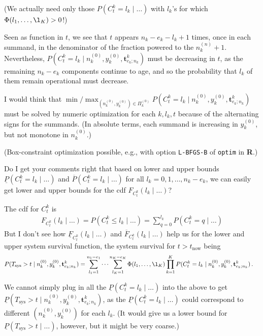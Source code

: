 \documentclass[12pt,a4paper,fleqn]{narms}
\newcommand{\mbf}[1]{\mathbf{#1}}
\newcommand{\uz}{^{(0)}} %
\newcommand{\un}{^{(n)}} %
\newcommand{\ul}[1]{\underline{#1}}
\newcommand{\ol}[1]{\overline{#1}}
\def\Tsys{T_\text{sys}}
\def\ykz{y\uz_k}
\def\nkz{n\uz_k}
\def\nkn{n\un_k}
\def\PkZ{\Pi\uz_k}
\def\tnow{t_\text{now}}
\begin{document}
(We actually need only those $P(C^k_t = l_k\mid \ldots)$ with $l_k$'s
for which $\Phi(l_1,\ldots,\l_K) > 0$!)


Seen as function in $t$, we see that $t$ appears $n_k-e_k-l_k+1$ times,
once in each summand, in the denominator of the fraction powered to the $\nkn+1$.
Nevertheless, $P(C^k_t = l_k\mid\nkz,\ykz, \mbf{t}^k_{e_k;n_k})$
must be decreasing in $t$, as the remaining $n_k-e_k$ components continue to age,
and so the probability that $l_k$ of them remain operational must decrease.

I would think that
$\min / \max_{(\nkz,\ykz) \in \PkZ} P(C^k_t = l_k\mid\nkz,\ykz, \mbf{t}^k_{e_k;n_k})$
must be solved by numeric optimization for each $k, l_k, t$ 
because of the alternating signs for the summands.
(In absolute terms, each summand is increasing in $\ykz$, but not monotone in $\nkz$.)

(Box-constraint optimization possible, e.g., with option \texttt{L-BFGS-B} of \texttt{optim} in \textbf{R}.)

Do I get your comments right that based on lower and upper bounds
$\ul{P}(C^k_t = l_k\mid \ldots)$ and $\ol{P}(C^k_t = l_k\mid \ldots)$ for all $l_k = 0, 1, \ldots, n_k - e_k$,
we can easily get lower and upper bounds for the cdf $F_{C^k_t}(l_k \mid \ldots)$?

The cdf for $C^k_t$ is 
\begin{align}
F_{C^k_t}(l_k \mid \ldots) = P(C^k_t \leq l_k\mid\ldots) = \sum_{q=0}^{l_k} P(C^k_t = q\mid\ldots)
\end{align} 
But I don't see how $\ul{F}_{C^k_t}(l_k \mid \ldots)$ and $\ol{F}_{C^k_t}(l_k \mid \ldots)$
help us for the lower and upper system survival function,
the system survival for $t > \tnow$ being
\begin{align}
P(\Tsys > t\mid\nkz,\ykz, \mbf{t}^k_{e_k;n_k})
 &= \sum_{l_1=1}^{n_1-e_1} \cdots \sum_{l_K=1}^{n_K-e_K} \Phi(l_1,\ldots,\l_K) \prod_{k=1}^K
    P(C^k_t = l_k\mid\nkz,\ykz, \mbf{t}^k_{e_k;n_k}) \,.
\end{align}

We cannot simply plug in all the $\ul{P}(C^k_t = l_k\mid \ldots)$ %
into the above to get $\ul{P}(\Tsys > t\mid\nkz,\ykz, \mbf{t}^k_{e_k;n_k})$, %
as the $\ul{P}(C^k_t = l_k\mid \ldots)$ could correspond to different $(\nkz,\ykz)$ for each $l_k$.
(It would give us a lower bound for $\ul{P}(\Tsys > t\mid\ldots)$, however, but it might be very coarse.)
\end{document}
